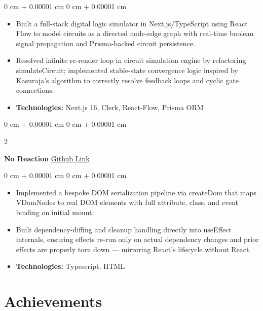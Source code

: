 \documentclass[10pt, letterpaper]{article}
\newenvironment{highlights}{
    \begin{itemize}[
        topsep=0.10 cm,
        parsep=0.10 cm,
        partopsep=0pt,
        itemsep=0pt,
        leftmargin=0 cm + 10pt
    ]
}{
    \end{itemize}
}
\newenvironment{onecolentry}{
    \begin{adjustwidth}{
        0 cm + 0.00001 cm
    }{
        0 cm + 0.00001 cm
    }
}{
    \end{adjustwidth}
}
\newenvironment{twocolentry}[2][]{
    \onecolentry
    \def\secondColumn{#2}
    \setcolumnwidth{\fill, 4.5 cm}
    \begin{paracol}{2}
}{
    \switchcolumn \raggedleft \secondColumn
    \end{paracol}
    \endonecolentry
}
\begin{document}
        \vspace{0.10 cm}
        \begin{onecolentry}
            \begin{highlights}
                \item Built a full-stack digital logic simulator in Next.js/TypeScript using React Flow to model circuits as a directed node-edge graph with real-time boolean signal propagation and Prisma-backed circuit persistence.
                \item Resolved infinite re-render loop in circuit simulation engine by refactoring simulateCircuit; implemented stable-state convergence logic inspired by Kasuraja's algorithm to correctly resolve feedback loops and cyclic gate connections.
                
                \item \textbf{Technologies:} Next.js 16, Clerk, React-Flow, Prisma ORM
            \end{highlights}
        \end{onecolentry}
    
        \vspace{0.2 cm}

        \begin{twocolentry}{
            \href{https://github.com/utk2602/No-Reaction}{Github Link}
        }
            \textbf{No Reaction}\end{twocolentry}

        \vspace{0.10 cm}
        \begin{onecolentry}
            \begin{highlights}
                \item Implemented a bespoke DOM serialization pipeline via createDom that maps VDomNodes to real DOM elements with full attribute, class, and event binding on initial mount.
                \item Built dependency-diffing and cleanup handling directly into useEffect internals, ensuring effects re-run only on actual dependency changes and prior effects are properly torn down — mirroring React's lifecycle without React.
                
                \item \textbf{Technologies:} Typescript, HTML
           \end{highlights}
        \end{onecolentry}

\section{Achievements}
\end{document}
